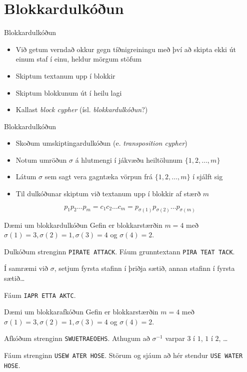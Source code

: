\documentclass{beamer}
\begin{document}
\section{Blokkardulkóðun}

\begin{frame}{Blokkardulkóðun}
\begin{itemize}
 \item Við getum verndað okkur gegn tíðnigreiningu með því að skipta ekki út einum staf í einu, heldur mörgum stöfum
 \item Skiptum textanum upp í blokkir
 \item Skiptum blokkunum út í heilu lagi
 \item Kallast \emph{block cypher} (ísl. \emph{blokkardulkóðun}?)
\end{itemize}
\end{frame}

\begin{frame}{Blokkardulkóðun}
\begin{itemize}
 \item Skoðum umskiptingardulkóðun (e. \emph{transposition cypher})
 \item Notum umröðun $\sigma$ á hlutmengi í jákvæðu heiltölunum $\{1, 2, \ldots, m\}$
 \item Látum $\sigma$ sem sagt vera gagntæka vörpun frá $\{1, 2, \ldots, m\}$ í sjálft sig
 \item Til dulkóðunar skiptum við textanum upp í blokkir af stærð $m$
\end{itemize}
\[
 p_1p_2\ldots p_m = c_1c_2\ldots c_m = p_{\sigma(1)}p_{\sigma(2)}\ldots p_{\sigma(m)}
\]

\end{frame}

\begin{frame}{Dæmi um blokkardulkóðun}
Gefin er blokkarstærðin $m=4$ með $\sigma(1) = 3, \sigma(2) = 1, \sigma(3) = 4$ og $\sigma(4) = 2$.

Dulkóðum strenginn \texttt{PIRATE ATTACK}. Fáum grunntextann \texttt{PIRA TEAT TACK}.

Í samræmi við $\sigma$, setjum fyrsta stafinn í þriðja sætið, annan stafinn í fyrsta sætið\ldots

Fáum \texttt{IAPR ETTA AKTC}.
\end{frame}

\begin{frame}{Dæmi um blokkarafkóðun}
Gefin er blokkarstærðin $m=4$ með $\sigma(1) = 3, \sigma(2) = 1, \sigma(3) = 4$ og $\sigma(4) = 2$.

Afkóðum strenginn \texttt{SWUETRAEOEHS}. Athugum að $\sigma^{-1}$ varpar $3$ í $1$, $1$ í $2$, \ldots

Fáum strenginn \texttt{USEW ATER HOSE}. Störum og sjáum að hér stendur \texttt{USE WATER HOSE}.
\end{frame}
\end{document}
